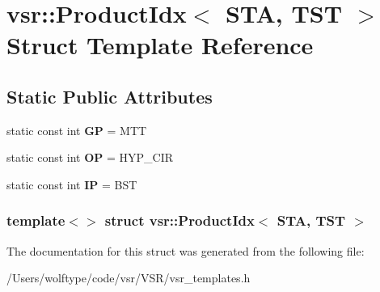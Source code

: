 \hypertarget{structvsr_1_1_product_idx_3_01_s_t_a_00_01_t_s_t_01_4}{\section{vsr\-:\-:Product\-Idx$<$ S\-T\-A, T\-S\-T $>$ Struct Template Reference}
\label{structvsr_1_1_product_idx_3_01_s_t_a_00_01_t_s_t_01_4}
}
\subsection*{Static Public Attributes}
\begin{DoxyCompactItemize}
\item 
\hypertarget{structvsr_1_1_product_idx_3_01_s_t_a_00_01_t_s_t_01_4_aed2eae6073e9ef36ad4c2e5483b56205}{static const int {\bfseries G\-P} = M\-T\-T}\label{structvsr_1_1_product_idx_3_01_s_t_a_00_01_t_s_t_01_4_aed2eae6073e9ef36ad4c2e5483b56205}

\item 
\hypertarget{structvsr_1_1_product_idx_3_01_s_t_a_00_01_t_s_t_01_4_adb9663c4f7a0415799ec607a6e95199e}{static const int {\bfseries O\-P} = H\-Y\-P\-\_\-\-C\-I\-R}\label{structvsr_1_1_product_idx_3_01_s_t_a_00_01_t_s_t_01_4_adb9663c4f7a0415799ec607a6e95199e}

\item 
\hypertarget{structvsr_1_1_product_idx_3_01_s_t_a_00_01_t_s_t_01_4_a6ad795a91773b2e6ed7bba5b57ca9dc6}{static const int {\bfseries I\-P} = B\-S\-T}\label{structvsr_1_1_product_idx_3_01_s_t_a_00_01_t_s_t_01_4_a6ad795a91773b2e6ed7bba5b57ca9dc6}

\end{DoxyCompactItemize}
\subsubsection*{template$<$$>$ struct vsr\-::\-Product\-Idx$<$ S\-T\-A, T\-S\-T $>$}



The documentation for this struct was generated from the following file\-:\begin{DoxyCompactItemize}
\item 
/\-Users/wolftype/code/vsr/\-V\-S\-R/vsr\-\_\-templates.\-h\end{DoxyCompactItemize}
